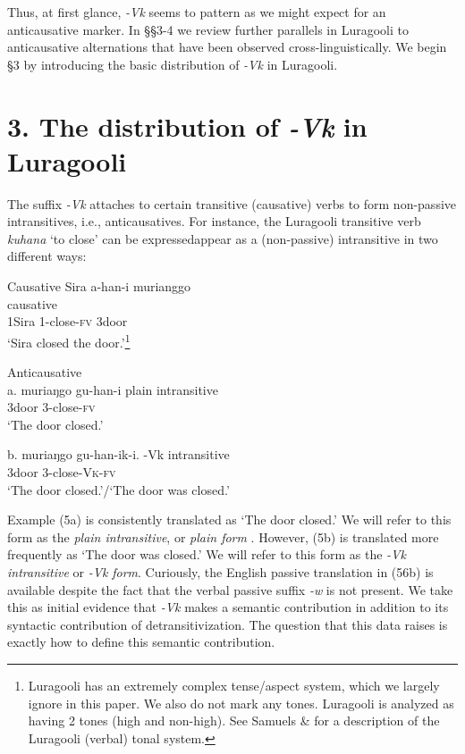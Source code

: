\documentclass[output=paper]{langsci/langscibook}
\begin{document}
Thus, at first glance, \textit{{}-}\textit{Vk}\textit{ }seems to pattern as we might expect for an anticausative marker. In §§3{}-4 we review further parallels in Luragooli to anticausative alternations that have been observed cross-linguistically. We begin §3 by introducing the basic distribution of \textit{{}-}\textit{Vk} in Luragooli.

\chapter{3. The distribution of \textit{{}-}\textit{Vk} in Luragooli}

The suffix \textit{{}-}\textit{Vk} attaches to certain transitive (causative) verbs 
to form non-passive intransitives, i.e., anticausatives. For instance, the Luragooli transitive verb \textit{kuhana} ‘to close’ can be expressedappear as a (non-passive) intransitive in two different ways:

\ea
{  Causative}
\gll Sira    a-han-i      murianggo\\
    causative\\
     1Sira 1-close{}-\textsc{fv}  3door\\
\glt ‘Sira closed the door.’\footnote{ Luragooli has an extremely complex tense/aspect system, which we largely ignore in this paper. We also do not mark any tones. Luragooli is analyzed as having 2 tones (high and non-high). See Samuels \& \citet{Paster2015} for a description of the Luragooli (verbal) tonal system.}\textsuperscript{ }
\z

\ea
{  Anticausative}\\
\gll a. muriaŋgo gu{}-han{}-i        plain intransitive\\
       3door       3-close-\textsc{fv}\\
\glt ‘The door closed.’
\z 

\ea
\gll b. muriaŋgo gu{}-han-ik{}-i.      {}-\textup{Vk} intransitive\\
       3door         3-close-\textsc{V}\textsc{k}{}-\textsc{fv}\\
\glt ‘The door closed.’/‘The door was closed.’
\z

Example (5a) is consistently translated as ‘The door closed.’ We will refer to this form as the \textit{plain intransitive}, or \textit{plain form} 
.\textsuperscript{ }However, (5b) is translated more frequently as ‘The door was closed.’ We will refer to this form as the \textit{{}-}\textit{Vk}\textit{ intransitive} or \textit{{}-}\textit{Vk}\textit{ form}. Curiously, the English passive translation in (56b) is available despite the fact that the verbal passive suffix \textit{{}-w }is not present. We take this as initial evidence that \textit{{}-}\textit{Vk} makes a semantic contribution in addition to its syntactic contribution of detransitivization. The question that this data raises is exactly how to define this semantic contribution.
\end{document}
